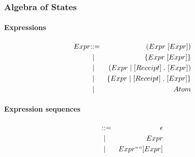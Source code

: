 \subsubsection{Algebra of States}


\paragraph{Expressions}
\begin{eqnarray*}
  Expr & \mathbin{\mathbf{::=}} & \mathsf{(} Expr \; [Expr] \mathsf{)} \\
  & \;\mathbin{\mathbf\mid}\; & \mathsf{\{} Expr \; [Expr] \mathsf{\}} \\
  & \;\mathbin{\mathbf\mid}\; & \mathsf{(} Expr{} \;\mathsf{|}\; [Receipt] \; \mathsf{.} \; [Expr] \mathsf{)} \\
 & \;\mathbin{\mathbf\mid}\; & \mathsf{\{} Expr \;\mathsf{|}\; [Receipt] \; \mathsf{.} \; [Expr] \mathsf{\}} \\
& \;\mathbin{\mathbf\mid}\; & Atom
\end{eqnarray*}

\paragraph{Expression sequences}
\begin{eqnarray*}
  [Expr] & \bc & \epsilon \\
  & \;\bm \; & Expr \\
  & \;\bm \; & Expr `` `` [Expr]
\end{eqnarray*}

